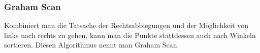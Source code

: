 \begin{frame}
{\begin{figure}[htbp]
\begin{center}
			\end{center}
		\end{figure}
	}
\end{frame}

\begin{frame}
	\frametitle{Graham Scan}
	Kombiniert man die Tatsache der Rechtsabbiegungen und der Möglichkeit von links nach rechts zu gehen, kann man die Punkte stattdessen auch nach Winkeln sortieren. Diesen Algorithmus nennt man Graham Scan.
\end{frame}

